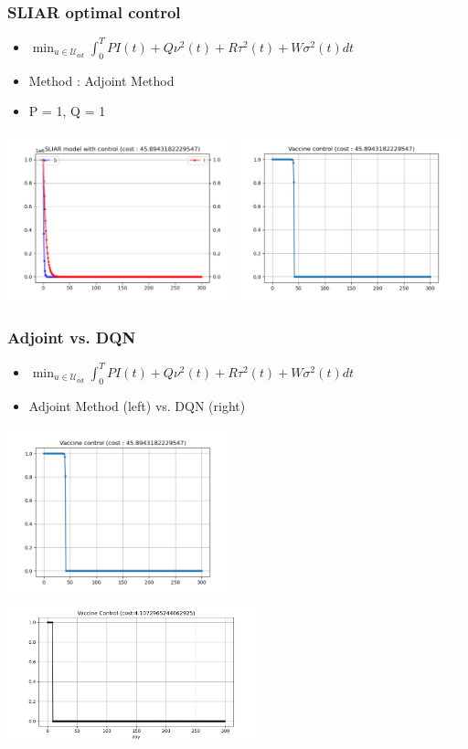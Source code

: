 \documentclass[usenames,dvipsnames, aspectratio=169, 9pt]{beamer}
\begin{document}
\begin{frame}\frametitle{SLIAR optimal control}
\begin{itemize}
\item $ \min_{u\in\mathcal{U}_{ad}} \int_0^T PI(t) + Q\nu^2(t) + R\tau^2(t) + W\sigma^2(t) dt$
\item Method : Adjoint Method
\item P = 1, Q = 1
\end{itemize}
    \centering
    \includegraphics[width=6.5cm]{figure/sliar_adj.png}
    \includegraphics[width=6.5cm]{figure/sliar_adj_control.png}
\end{frame}

\begin{frame}\frametitle{Adjoint vs. DQN}
\begin{itemize}
\item $ \min_{u\in\mathcal{U}_{ad}} \int_0^T PI(t) + Q\nu^2(t) + R\tau^2(t) + W\sigma^2(t) dt$
\item Adjoint Method (left) vs. DQN (right)
\end{itemize}
    \centering
    \includegraphics[width=6.5cm]{figure/sliar_adj_control.png}
    \includegraphics[height=4.1cm]{figure/sliar_dqn_control.png}
\end{frame}
\end{document}
